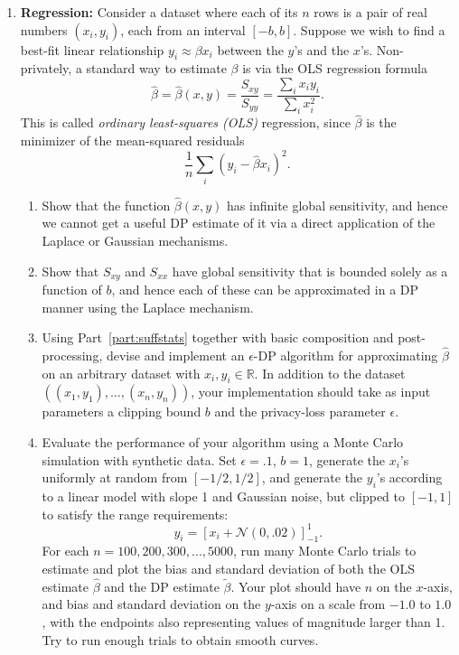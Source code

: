 \documentclass[11pt]{article}
\newcommand{\R}{\mathbb{R}}
\begin{document}
\begin{enumerate}[leftmargin=*]
\item \textbf{Regression: } 
Consider a dataset where each of its $n$ rows is a pair of real numbers $(x_i,y_i)$, each from an interval $[-b,b]$.  Suppose we wish to find a best-fit linear relationship $y_i \approx \beta x_i$ between the $y$'s and the $x$'s.  Non-privately, a standard way to estimate $\beta$ is via the OLS regression formula 
$$\hat{\beta} = \hat{\beta}(x,y) =  \frac{S_{xy}}{S_{yy}}
= \frac{\sum_i x_iy_i}{\sum_i x_i^2}.$$
This is called {\em ordinary least-squares (OLS)} regression, since $\hat{\beta}$ is the minimizer of the mean-squared residuals 
\begin{equation} \label{eqn:residuals}
    \frac{1}{n} \sum_i (y_i -\hat{\beta} x_i)^2.
\end{equation}

\begin{enumerate}
    \item Show that the function $\hat{\beta}(x,y)$ has infinite global sensitivity, and hence we cannot get a useful DP estimate of it via a direct application of the Laplace or Gaussian mechanisms.
    \item Show that $S_{xy}$ and $S_{xx}$ have global sensitivity that is bounded solely as a function of $b$, and hence each of these can be approximated in a DP manner using the Laplace mechanism. \label{part:suffstats}
    \item Using Part~\ref{part:suffstats} together with basic composition and post-processing,  devise and implement an $\epsilon$-DP algorithm for approximating $\hat{\beta}$ on an arbitrary dataset with $x_i,y_i\in \R$.  In addition to the dataset $((x_1,y_1),\ldots,(x_n,y_n))$, your implementation should take as input parameters a clipping bound $b$ and the privacy-loss parameter $\epsilon$.

    
    \item \label{part:MonteCarlo}
    Evaluate the performance of your
    algorithm using a Monte Carlo simulation with
    synthetic data.
    Set $\epsilon=.1$, $b=1$, generate the $x_i$'s uniformly at random from $[-1/2,1/2]$,
    and generate the $y_i$'s 
    according to a linear model with slope 1 and Gaussian noise, but clipped to $[-1,1]$ to satisfy the range requirements:
    $$y_i = \left[x_i + \mathcal{N}(0,.02)\right]_{-1}^1.$$
    For each $n=100,200,300,\ldots,5000$, run many Monte Carlo trials to estimate and plot the bias and standard deviation of both the OLS estimate $\hat{\beta}$ and the DP estimate $\tilde{\beta}$.  Your plot should have $n$ on the $x$-axis, and bias and standard deviation on the $y$-axis on a scale from $-1.0$ to $1.0$, with the endpoints also representing values of magnitude larger than 1.  Try to run enough trials to obtain smooth curves.
    

\end{enumerate}
\end{enumerate}
\end{document}
